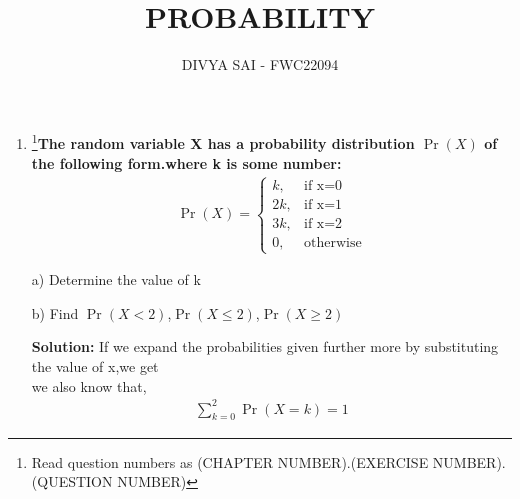 \documentclass{article}
\providecommand{\pr}[1]{\ensuremath{\Pr\left(#1\right)}}
\newcommand{\solution}{\noindent \textbf{Solution: }}
\begin{document}
\title{PROBABILITY}
\author{\Large DIVYA SAI - FWC22094}
\date{}

\maketitle
\begin{enumerate}
[label=16.\arabic{enumi}.\arabic{enumii}]%
\setcounter{enumi}{3}
\setcounter{enumii}{10}

\item \footnote{Read question numbers as (CHAPTER NUMBER).(EXERCISE NUMBER).(QUESTION NUMBER)}\textbf {The random variable X has a probability distribution \pr{X} of the following form.where k is some number: }
\begin{align}
  \pr{X} =
    \begin{cases}
      k,  & \text{if x=0}\\
      2k, & \text{if x=1}\\
      3k, & \text{if x=2}\\
      0 , & \text{otherwise}
    \end{cases}       
\end{align}

a) Determine the value of k 

b) Find \pr{X < 2},\pr{X \leq 2},\pr{X \geq 2}  


\solution
If we expand the probabilities given further more
by substituting the value of x,we get\\
we also know that,
\begin{align}
    \sum_{k = 0}^2 \pr{X = k} = 1 \label{eq 2.0.1}
\end{align}


\end{enumerate}
\end{document}
